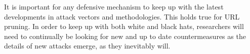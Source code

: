 It is  important for any defensive mechanism to keep up with the latest developments in attack vectors and methodologies. This holds true for URL pruning. In order to keep up with both white and black hats, researchers will need to continually be looking for new and up to date countermeasures as the details of new attacks emerge, as they inevitably will.

 

